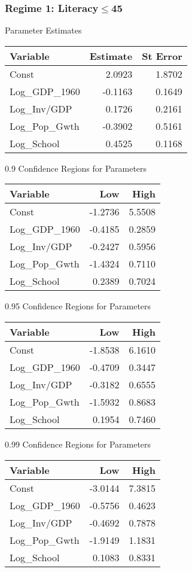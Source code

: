 \subsubsection*{Regime 1: Literacy$\leq$45 } 
Parameter Estimates \\
\begin{tabular}{l*{2}{r}}
\toprule
Variable    &   Estimate     &   St Error \\
\midrule 
Const   &    2.0923   &   1.8702 \\
Log\_GDP\_1960   &   -0.1163   &   0.1649 \\
Log\_Inv/GDP   &    0.1726   &   0.2161 \\
Log\_Pop\_Gwth   &   -0.3902   &   0.5161 \\
Log\_School   &    0.4525   &   0.1168 \\
\bottomrule
\end{tabular}
\bigskip 

0.9 Confidence Regions for Parameters \\
\begin{tabular}{l*{2}{r}}
\toprule
Variable   &    Low            &   High \\
\midrule 
Const   &   -1.2736   &   5.5508 \\
Log\_GDP\_1960   &   -0.4185   &   0.2859 \\
Log\_Inv/GDP   &   -0.2427   &   0.5956 \\
Log\_Pop\_Gwth   &   -1.4324   &   0.7110 \\
Log\_School   &    0.2389   &   0.7024 \\
\bottomrule
\end{tabular}
\bigskip 

0.95 Confidence Regions for Parameters \\
\begin{tabular}{l*{2}{r}}
\toprule
Variable   &    Low            &   High \\
\midrule 
Const   &   -1.8538   &   6.1610 \\
Log\_GDP\_1960   &   -0.4709   &   0.3447 \\
Log\_Inv/GDP   &   -0.3182   &   0.6555 \\
Log\_Pop\_Gwth   &   -1.5932   &   0.8683 \\
Log\_School   &    0.1954   &   0.7460 \\
\bottomrule
\end{tabular}
\bigskip 

0.99 Confidence Regions for Parameters \\
\begin{tabular}{l*{2}{r}}
\toprule
Variable   &    Low            &   High \\
\midrule 
Const   &   -3.0144   &   7.3815 \\
Log\_GDP\_1960   &   -0.5756   &   0.4623 \\
Log\_Inv/GDP   &   -0.4692   &   0.7878 \\
Log\_Pop\_Gwth   &   -1.9149   &   1.1831 \\
Log\_School   &    0.1083   &   0.8331 \\
\bottomrule
\end{tabular}
\bigskip 

